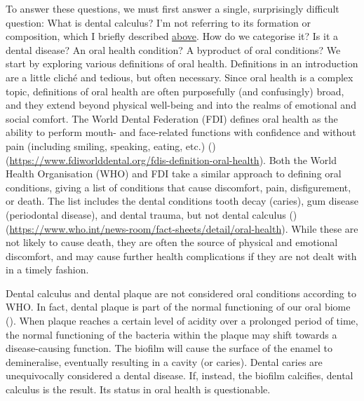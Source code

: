 \documentclass[
  b5paper,
]{book}
\begin{document}
To answer these questions, we must first answer a single, surprisingly
difficult question: What is dental calculus? I'm not referring to its
formation or composition, which I briefly described
\hyperref[chap-intro]{above}. How do we categorise it? Is it a dental
disease? An oral health condition? A byproduct of oral conditions? We
start by exploring various definitions of oral health. Definitions in an
introduction are a little cliché and tedious, but often necessary. Since
oral health is a complex topic, definitions of oral health are often
purposefully (and confusingly) broad, and they extend beyond physical
well-being and into the realms of emotional and social comfort. The
World Dental Federation (FDI) defines oral health as the ability to
perform mouth- and face-related functions with confidence and without
pain (including smiling, speaking, eating, etc.)
()
(\url{https://www.fdiworlddental.org/fdis-definition-oral-health}). Both
the World Health Organisation (WHO) and FDI take a similar approach to
defining oral conditions, giving a list of conditions that cause
discomfort, pain, disfigurement, or death. The list includes the dental
conditions tooth decay (caries), gum disease (periodontal disease), and
dental trauma, but not dental calculus
()
(\url{https://www.who.int/news-room/fact-sheets/detail/oral-health}).
While these are not likely to cause death, they are often the source of
physical and emotional discomfort, and may cause further health
complications if they are not dealt with in a timely fashion.

Dental calculus and dental plaque are not considered oral conditions
according to WHO. In fact, dental plaque is part of the normal
functioning of our oral biome
(). When plaque reaches
a certain level of acidity over a prolonged period of time, the normal
functioning of the bacteria within the plaque may shift towards a
disease-causing function. The biofilm will cause the surface of the
enamel to demineralise, eventually resulting in a cavity (or caries).
Dental caries are unequivocally considered a dental disease. If,
instead, the biofilm calcifies, dental calculus is the result. Its
status in oral health is questionable.
\end{document}

